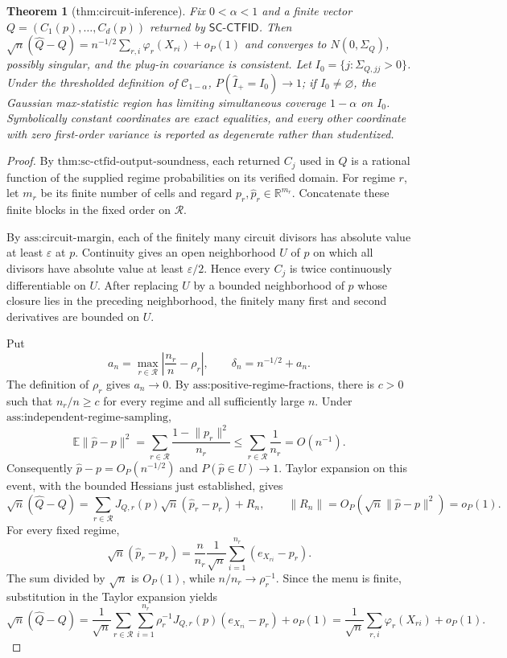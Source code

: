\documentclass{article}
\newtheorem{theorem}{Theorem}
\begin{document}
\begin{theorem}[thm:circuit-inference]\label{thm:circuit-inference}
Fix \(0<\alpha<1\) and a finite vector \(Q=(C_1(p),\ldots,C_d(p))\) returned by \(\mathsf{SC\mbox{-}CTFID}\).  Then \(\sqrt n(\widehat Q-Q)=n^{-1/2}\sum_{r,i}\varphi_r(X_{ri})+o_P(1)\) and converges to \(N(0,\Sigma_Q)\), possibly singular, and the plug-in covariance is consistent.  Let \(I_0=\{j:\Sigma_{Q,jj}>0\}\).  Under the thresholded definition of \(\mathcal C_{1-\alpha}\), \(P(\widehat I_+=I_0)\to1\); if \(I_0\ne\varnothing\), the Gaussian max-statistic region has limiting simultaneous coverage \(1-\alpha\) on \(I_0\).  Symbolically constant coordinates are exact equalities, and every other coordinate with zero first-order variance is reported as degenerate rather than studentized.
\end{theorem}
\begin{proof}
By \(\text{thm:sc-ctfid-output-soundness}\), each returned \(C_j\) used in \(Q\) is a rational function of the supplied regime probabilities on its verified domain.  For regime \(r\), let \(m_r\) be its finite number of cells and regard \(p_r,\widehat p_r\in\mathbb R^{m_r}\).  Concatenate these finite blocks in the fixed order on \(\mathcal R\).

By \(\text{ass:circuit-margin}\), each of the finitely many circuit divisors has absolute value at least \(\varepsilon\) at \(p\).  Continuity gives an open neighborhood \(U\) of \(p\) on which all divisors have absolute value at least \(\varepsilon/2\).  Hence every \(C_j\) is twice continuously differentiable on \(U\).  After replacing \(U\) by a bounded neighborhood of \(p\) whose closure lies in the preceding neighborhood, the finitely many first and second derivatives are bounded on \(U\).

Put
\[
 a_n=\max_{r\in\mathcal R}\left|\frac{n_r}{n}-\rho_r\right|,
 \qquad \delta_n=n^{-1/2}+a_n.
\]
The definition of \(\rho_r\) gives \(a_n\to0\).  By \(\text{ass:positive-regime-fractions}\), there is \(c>0\) such that \(n_r/n\ge c\) for every regime and all sufficiently large \(n\).  Under \(\text{ass:independent-regime-sampling}\),
\[
 \mathbb E\lVert\widehat p-p\rVert^2
 =\sum_{r\in\mathcal R}\frac{1-\lVert p_r\rVert^2}{n_r}
 \le\sum_{r\in\mathcal R}\frac1{n_r}
 =O(n^{-1}).
\]
Consequently \(\widehat p-p=O_P(n^{-1/2})\) and \(P(\widehat p\in U)\to1\).  Taylor expansion on this event, with the bounded Hessians just established, gives
\[
 \sqrt n(\widehat Q-Q)
 =\sum_{r\in\mathcal R}J_{Q,r}(p)\sqrt n(\widehat p_r-p_r)+R_n,
 \qquad
 \lVert R_n\rVert
 =O_P\!\left(\sqrt n\lVert\widehat p-p\rVert^2\right)
 =o_P(1).
\]
For every fixed regime,
\[
 \sqrt n(\widehat p_r-p_r)
 =\frac{n}{n_r}\frac1{\sqrt n}
   \sum_{i=1}^{n_r}(e_{X_{ri}}-p_r).
\]
The sum divided by \(\sqrt n\) is \(O_P(1)\), while \(n/n_r\to\rho_r^{-1}\).  Since the menu is finite, substitution in the Taylor expansion yields
\[
 \sqrt n(\widehat Q-Q)
 =\frac1{\sqrt n}\sum_{r\in\mathcal R}\sum_{i=1}^{n_r}
   \rho_r^{-1}J_{Q,r}(p)(e_{X_{ri}}-p_r)+o_P(1)
 =\frac1{\sqrt n}\sum_{r,i}\varphi_r(X_{ri})+o_P(1).
\]


\end{proof}
\end{document}
